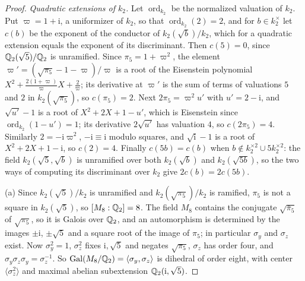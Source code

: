 \begin{proof}
\emph{Quadratic extensions of $k_2$.} Let $\operatorname{ord}_{k_2}$ be the
normalized valuation of $k_2$. Put $\varpi=1+\mathrm i$, a uniformizer of $k_2$,
so that $\operatorname{ord}_{k_2}(2)=2$, and for $b\in k_2^\times$ let $c(b)$ be the exponent of the
conductor of $k_2(\sqrt b)/k_2$, which for a quadratic extension equals the
exponent of its discriminant. Then $c(5)=0$, since $\mathbb Q_2(\sqrt5)/\mathbb Q_2$ is
unramified. Since $\pi_5=1+\varpi^2$, the element
$\varpi'=(\sqrt{\pi_5}-1-\varpi)/\varpi$ is a root of the Eisenstein
polynomial $X^2+\frac{2(1+\varpi)}\varpi X+\frac2\varpi$; its derivative at
$\varpi'$ is the sum of terms of valuations $5$ and $2$ in
$k_2(\sqrt{\pi_5})$, so $c(\pi_5)=2$. Next $2\pi_5=\varpi^2u'$ with
$u'=2-\mathrm i$, and $\sqrt{u'}-1$ is a root of $X^2+2X+1-u'$, which
is Eisenstein since $\operatorname{ord}_{k_2}(1-u')=1$; its derivative $2\sqrt{u'}$ has
valuation $4$, so $c(2\pi_5)=4$. Similarly $2=-\mathrm i\varpi^2$, $-\mathrm i\equiv\mathrm i$
modulo squares, and $\sqrt{\mathrm i}-1$ is a root of $X^2+2X+1-\mathrm i$, so $c(2)=4$.
Finally $c(5b)=c(b)$ when $b\notin k_2^{\times2}\cup5k_2^{\times2}$: the field
$k_2(\sqrt5,\sqrt b)$ is unramified over both $k_2(\sqrt b)$ and $k_2(\sqrt{5b})$,
so the two ways of computing its discriminant over $k_2$ give $2c(b)=2c(5b)$.

(a) Since $k_2(\sqrt5)/k_2$ is unramified and $k_2(\sqrt{\pi_5})/k_2$ is ramified,
$\pi_5$ is not a square in $k_2(\sqrt5)$, so $[M_8:\mathbb Q_2]=8$. The field $M_8$
contains the conjugate $\sqrt{\bar\pi_5}$ of $\sqrt{\pi_5}$, so it is Galois
over $\mathbb Q_2$, and an automorphism is determined by the images $\pm\mathrm i$,
$\pm\sqrt5$ and a square root of the image of $\pi_5$; in particular
$\sigma_y$ and $\sigma_z$ exist. Now $\sigma_y^2=1$, $\sigma_z^2$ fixes
$\mathrm i,\sqrt5$ and negates $\sqrt{\pi_5}$, $\sigma_z$ has order four, and
$\sigma_y\sigma_z\sigma_y=\sigma_z^{-1}$. So
$\operatorname{Gal}(M_8/\mathbb Q_2)=\langle\sigma_y,\sigma_z\rangle$ is dihedral of order eight,
with center $\langle\sigma_z^2\rangle$ and maximal abelian subextension
$\mathbb Q_2(\mathrm i,\sqrt5)$.


\end{proof}
